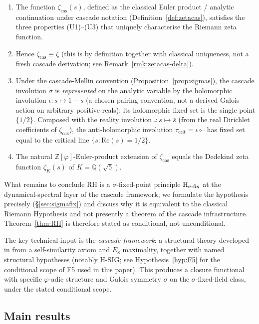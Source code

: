 \documentclass[11pt, a4paper]{amsart}
\theoremstyle{definition}
\newcommand{\Z}{\mathbb{Z}}
\newcommand{\Q}{\mathbb{Q}}
\newcommand{\pphi}{\varphi}
\newcommand{\zetacas}{\zeta_{\mathrm{cas}}}
\begin{document}
\begin{enumerate}
\item The function $\zetacas(s)$, defined as the classical Euler
product / analytic continuation under cascade notation
(Definition~\ref{def:zetacas}), satisfies the three properties
(U1)--(U3) that uniquely characterise the Riemann zeta function.
\item Hence $\zetacas \equiv \zeta$ (this is by definition together
with classical uniqueness, not a fresh cascade derivation; see
Remark~\ref{rmk:zetacas-delta}).
\item Under the cascade-Mellin convention
(Proposition~\ref{prop:sigmas}), the cascade involution $\sigma$ is
\emph{represented} on the analytic variable by the holomorphic
involution $\iota: s \mapsto 1-s$ (a chosen pairing convention,
not a derived Galois action on arbitrary positive reals); its
holomorphic fixed set is the single point $\{1/2\}$. Composed with the reality
involution $\bar{\ }: s \mapsto \bar{s}$ (from the real Dirichlet
coefficients of $\zetacas$), the anti-holomorphic involution
$\tau_{\mathrm{crit}} = \iota \circ \bar{\ }$ has fixed set equal to the critical
line $\{s : \mathrm{Re}(s) = 1/2\}$.
\item The natural $\Z[\pphi]$-Euler-product extension of $\zetacas$
equals the Dedekind zeta function $\zeta_K(s)$ of $K = \Q(\sqrt{5})$.
\end{enumerate}

What remains to conclude RH is a $\sigma$-fixed-point principle
$\textup{H}_{\sigma\text{-fix}}$ at the dynamical-spectral layer of
the cascade framework; we formulate the hypothesis precisely
(\S\ref{sec:sigmafix}) and discuss why it is equivalent to the
classical Riemann Hypothesis and not presently a theorem of the
cascade infrastructure. Theorem~\ref{thm:RH} is therefore stated
as conditional, not unconditional.

The key technical input is the \emph{cascade framework}: a
structural theory developed in \cite{CascadeFoundations,
PaperXXXVI} from a self-similarity axiom and $E_8$ maximality,
together with named structural hypotheses (notably H-SIG; see
Hypothesis~\ref{hyp:F5} for the conditional scope of F5 used in
this paper).  This produces a closure functional with specific
$\pphi$-adic structure and Galois symmetry $\sigma$ on the
$\sigma$-fixed-field class, under the stated conditional scope.

\subsection{Main results}
\end{document}
